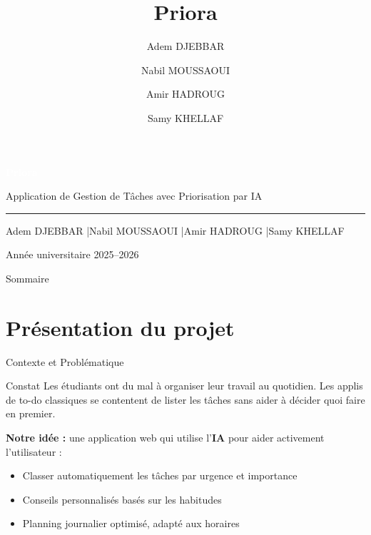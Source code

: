 \documentclass[aspectratio=169, 10pt]{beamer}
\title{Priora}
\author[Groupe Y]{Adem DJEBBAR \and Nabil MOUSSAOUI \and Amir HADROUG \and Samy KHELLAF}
\begin{document}
{
\begin{frame}[plain]
\vfill
\begin{center}
{\Huge\bfseries\textcolor{white}{Priora}}\par
\vspace{0.2cm}
{\normalsize\textcolor{accent!70!white}{Application de Gestion de Tâches avec Priorisation par IA}}\par
\vspace{0.7cm}
\textcolor{muted}{\rule{5cm}{0.3pt}}\par
\vspace{0.5cm}
{\small\textcolor{light}{Adem DJEBBAR \quad\textcolor{muted}{|}\quad Nabil MOUSSAOUI \quad\textcolor{muted}{|}\quad Amir HADROUG \quad\textcolor{muted}{|}\quad Samy KHELLAF}}\par
\vspace{0.5cm}
\par
\vspace{0.2cm}
{\scriptsize\textcolor{muted}{Année universitaire 2025--2026}}
\end{center}
\vfill
\end{frame}
}

\begin{frame}{Sommaire}
\tableofcontents
\end{frame}

\section{Présentation du projet}

\begin{frame}{Contexte et Problématique}
\begin{block}{Constat}
\small Les étudiants ont du mal à organiser leur travail au quotidien. Les applis de to-do classiques se contentent de lister les tâches sans aider à décider quoi faire en premier.
\end{block}
\vspace{0.3cm}
\textbf{\textcolor{secondary}{Notre idée :}} une application web qui utilise l'\textbf{IA} pour aider activement l'utilisateur :
\vspace{0.2cm}
\begin{itemize}
    \item Classer automatiquement les tâches par urgence et importance
    \item Conseils personnalisés basés sur les habitudes
    \item Planning journalier optimisé, adapté aux horaires
\end{itemize}
\end{frame}
\end{document}

